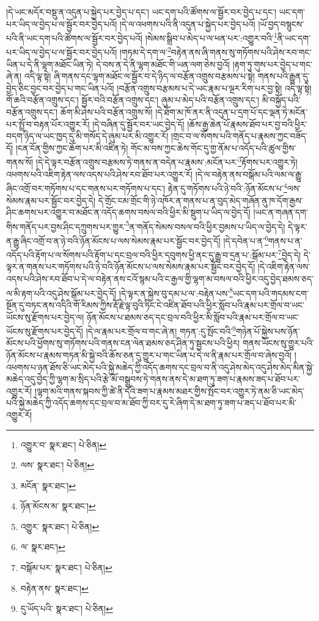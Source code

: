 །དེ་ཡང་མདོར་བསྡུ་ན་འདུན་པ་སྐྱེད་པར་བྱེད་པ་དང་། ཡང་དག་པའི་ཚོགས་ལ་སྦྱོར་བར་བྱེད་པ་དང་། ཡང་དག་པར་ཡིད་ལ་བྱེད་པ་ལ་སྦྱོར་བར་བྱེད་པའོ། །དེ་ལ་འཕགས་པའི་ནི་འདུན་པ་སྐྱེད་པར་བྱེད་པའོ། །ཡོ་བྱད་བསྙུངས་པའི་ནི་ཡང་དག་པའི་ཚོགས་ལ་སྦྱོར་བར་བྱེད་པའོ། །སེམས་སྒྲིབ་པ་མེད་པ་ལ་ཕན་པར་:འགྱུར་བའི་\footnote{འགྱུར་བ་  སྣར་ཐང་།  པེ་ཅིན། }ནི་ཡང་དག་པར་ཡིད་ལ་བྱེད་པ་ལ་སྦྱོར་བར་བྱེད་པའོ། །གཏམ་དེ་དག་ལ་\footnote{ལས་  སྣར་ཐང་།  པེ་ཅིན། }བརྟེན་ནས་ཞི་གནས་སུ་གཏོགས་པའི་ཤེས་རབ་གང་ཡིན་པ་དེ་ནི་ལྷག་མཐོང་ཡིན་ཏེ། དེ་བས་ན་དེ་ནི་ལྷག་མཐོང་གི་ཡན་ལག་ཅེས་བྱའོ། །རྟག་ཏུ་གུས་པར་བྱེད་པ་གང་ཞེ་ན། འདི་ལྟ་སྟེ། ཞི་གནས་དང་ལྷག་མཐོང་ལ་སྦྱོར་བ་དེ་ཉིད་ལ་བརྩོན་འགྲུས་བརྩམས་པ་སྟེ། གནས་པའི་རྒྱུན་དུ་བྱེད་ཅིང་བྱང་བར་བྱེད་པ་གང་ཡིན་པའོ། །བརྩོན་འགྲུས་བརྩམས་པ་དེ་ཡང་རྣམ་པ་ལྔར་རིག་པར་བྱ་སྟེ། འདི་ལྟ་སྟེ། གོ་ཆའི་བརྩོན་འགྲུས་དང་། སྦྱོར་བའི་བརྩོན་འགྲུས་དང་། ཞུམ་པ་མེད་པའི་བརྩོན་འགྲུས་དང་། མི་བསྐྱོད་པའི་བརྩོན་འགྲུས་དང་། ཆོག་མི་ཤེས་པའི་བརྩོན་འགྲུས་སོ། །དེ་ཐོག་མ་ཁོ་ནར་ནི་འདུན་པ་དྲག་པོ་དང་ལྡན་ཏེ་མངོན་པར་སྤྲོ་བ་བརྟན་པོར་འགྱུར་རོ། །དེ་བཞིན་དུ་སྦྱོར་བར་ཡང་བྱེད་དོ། །ཆོས་རྒྱ་ཆེན་པོ་རྣམས་ཐོབ་པར་བྱ་བའི་ཕྱིར་བདག་ཉིད་ལ་ཡང་ཁྱད་དུ་མི་གསོད་དེ་ཞུམ་པར་མི་འགྱུར་རོ། །གྲང་བ་ལ་སོགས་པའི་གནོད་པ་རྣམས་ཀྱང་བཟོད་དོ། །ངན་ངོན་གྱིས་ཀྱང་ཆོག་པར་མི་འཛིན་ཏེ། གོང་མ་བས་ཀྱང་ཆེས་གོང་དུ་གྱ་ནོམ་པ་འདོད་པའི་ཚུལ་གྱིས་གནས་སོ། །དེ་དེ་ལྟར་བརྩོན་འགྲུས་བརྩམས་ཏེ་གནས་ན་བདེན་པ་རྣམས་:མངོན་པར་\footnote{མངོན་  སྣར་ཐང་། }རྟོགས་པར་འགྱུར་ཏེ། འཕགས་པའི་འཇིག་རྟེན་ལས་འདས་པའི་ཤེས་རབ་ཐོབ་པར་འགྱུར་རོ། །དེ་ལ་བརྟེན་ནས་བསྒོམ་པའི་ལམ་ལ་རྒྱུ་ཞིང་འགྲོ་བར་གཏོགས་པ་དང་གནས་པར་གཏོགས་པ་དང་། རྟེན་དུ་གཏོགས་པའི་ཉེ་བའི་:ཉོན་མོངས་པ་\footnote{ཉོན་མོངས་མ་  སྣར་ཐང་། }ལས་སེམས་རྣམ་པར་སྦྱོང་བར་བྱེད་དེ། དེ་གྲོང་ངམ་གྲོང་གི་ཉེ་འཁོར་ན་གནས་པ་ན་བུད་མེད་གཞོན་ནུ་ཁ་དོག་རྒྱས་ཤིང་ཆགས་པར་འགྱུར་བ་མཐོང་ན་འདོད་ཆགས་བསལ་བའི་ཕྱིར་མི་སྡུག་པ་ཡིད་ལ་བྱེད་དོ། །ཡང་ན་གཞན་དག་གིས་གནོད་པར་བྱས་ཤིང་དཀྲུགས་པར་གྱུར་\footnote{འགྱུར་  སྣར་ཐང་།  པེ་ཅིན། }ན་གནོད་སེམས་བསལ་བའི་ཕྱིར་བྱམས་པ་ཡིད་ལ་བྱེད་དེ། དེ་ལྟར་ན་རྒྱུ་ཞིང་འགྲོ་བ་ན་ཉེ་བའི་ཉོན་མོངས་པ་ལས་སེམས་རྣམ་པར་སྦྱོང་བར་བྱེད་དོ། །དེ་དབེན་པ་ན་\footnote{ལ་  སྣར་ཐང་། }གནས་པ་ན་འདོད་པའི་རྟོག་པ་ལ་སོགས་པའི་རྟོག་པ་དང་བྲལ་བའི་ཕྱིར་དབུགས་ཕྱི་ནང་དུ་རྒྱུ་བ་དྲན་པ་:སྒོམ་པར་\footnote{བསྒོམ་པར་  སྣར་ཐང་།  པེ་ཅིན། }བྱེད་དེ། དེ་ལྟར་ན་གནས་པར་གཏོགས་པའི་ཉེ་བའི་ཉོན་མོངས་པ་ལས་སེམས་རྣམ་པར་སྦྱོང་བར་བྱེད་དོ། །དེ་འཇིག་རྟེན་ལས་འདས་པའི་ཤེས་རབ་ཐོབ་པ་དེ་ལ་བརྟེན་ནས་ངའོ་སྙམ་པའི་ང་རྒྱལ་གྱི་ལྷག་མ་བསལ་བའི་ཕྱིར་འདུ་བྱེད་ཐམས་ཅད་ལ་མི་རྟག་པའི་འདུ་ཤེས་སྒོམ་པར་བྱེད་དོ། །དེ་ལྟར་ན་སྐྱེས་བུ་དམ་པ་ལ་:བརྟེན་པས་\footnote{བརྟེན་ནས་  སྣར་ཐང་། }ཡང་དག་པའི་གདམས་ངག་སྔོན་དུ་བཏང་ནས་འདིའི་གོ་རིམས་ཀྱིས་རྡོ་རྗེ་ལྟ་བུའི་ཏིང་ངེ་འཛིན་ཐོབ་པའི་ཕྱིར་སློབ་པའི་རྣམ་པར་གྲོལ་བ་ཡང་ཡོངས་སུ་རྫོགས་པར་བྱེད་ལ། ཉོན་མོངས་པ་ཐམས་ཅད་དང་བྲལ་བའི་ཕྱིར་མི་སློབ་པའི་རྣམ་པར་གྲོལ་བ་ཡང་ཡོངས་སུ་རྫོགས་པར་བྱེད་དོ། །དེ་ལ་རྣམ་པར་གྲོལ་བ་གང་ཞེ་ན། གཏན་:དུ་སྤོང་བའི་\footnote{དུ་ཡོད་པའི་  སྣར་ཐང་།  པེ་ཅིན། }གཉེན་པོ་སྐྱེས་པས་ཉོན་མོངས་པའི་ཕྱོགས་སུ་གཏོགས་པའི་གནས་ངན་ལེན་ཐམས་ཅད་ཤིན་ཏུ་སྦྱངས་པའི་ཕྱིར། གནས་ཡོངས་སུ་གྱུར་པའི་ཉོན་མོངས་པ་རྣམས་གཏན་མི་སྐྱེ་བའི་ཆོས་ཅན་དུ་གྱུར་པ་གང་ཡིན་པ་དེ་ལ་ནི་རྣམ་པར་གྲོལ་བ་ཞེས་བྱའོ། །འཕགས་པ་ཉན་ཐོས་ཅི་ཡང་མེད་པའི་སྐྱེ་མཆེད་ཀྱི་འདོད་ཆགས་དང་བྲལ་བ་ནི་འདུ་ཤེས་མེད་འདུ་ཤེས་མེད་མིན་སྐྱེ་མཆེད་འདུ་བྱེད་ཀྱི་ལྷག་མ་སྲིད་པའི་རྩེ་མོ་བསྒྲུབས་ཏེ་གནས་ནས་དེ་མ་ཐག་ཏུ་ཟག་པ་རྣམས་ཟད་པ་ཐོབ་པར་འགྱུར་རོ། །ལྷག་མའི་གནས་སྐབས་ཀྱི་ཚེ་ནི་དེའི་ཟག་པ་རྣམས་མཐར་གྱིས་སྤོང་བར་འགྱུར་ཏེ་ནམ་ཅི་ཡང་མེད་པའི་སྐྱེ་མཆེད་ཀྱི་འདོད་ཆགས་དང་བྲལ་བ་མ་ཐོབ་ཀྱི་བར་དུ་རེ་ཞིག་དེ་མ་ཐག་ཏུ་ཟག་པ་ཟད་པ་ཐོབ་པར་མི་འགྱུར་རོ། 